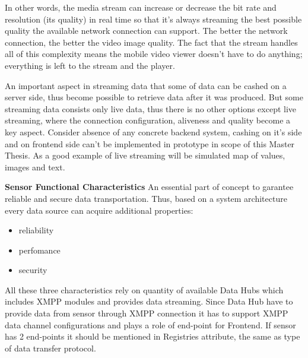   In other words, the media stream can increase or decrease the bit rate and resolution (its quality) in real time so that it's always streaming the best possible quality the available network connection can support. The better the network connection, the better the video image quality. The fact that the stream handles all of this complexity means the mobile video viewer doesn't have to do anything; everything is left to the stream and the player.

  An important aspect in streaming data that some of data can be cashed on a server side, thus become possible to retrieve data after it was produced. But some streaming data consists only live data, thus there is no other options except live streaming, where the connection configuration, aliveness and quality become a key aspect. Consider absence of any concrete backend system, cashing on it's side and on frontend side can't be implemented in prototype in scope of this Master Thesis. As a good example of live streaming will be simulated map of values, images and text.

  \textbf{Sensor Functional Characteristics}
  \newline
  An essential part of concept to garantee reliable and secure data transportation. Thus, based on a system architecture every data source can acquire additional properties:
  \begin{itemize}
  \item reliability
  \item perfomance
  \item security
  \end{itemize}
  All these three characteristics rely on quantity of available Data Hubs which includes XMPP modules and provides data streaming. Since Data Hub have to provide data from sensor through XMPP connection it has to support XMPP data channel configurations and plays a role of end-point for Frontend. If sensor has 2 end-points it should be mentioned in Registries attribute, the same as type of data transfer protocol.

